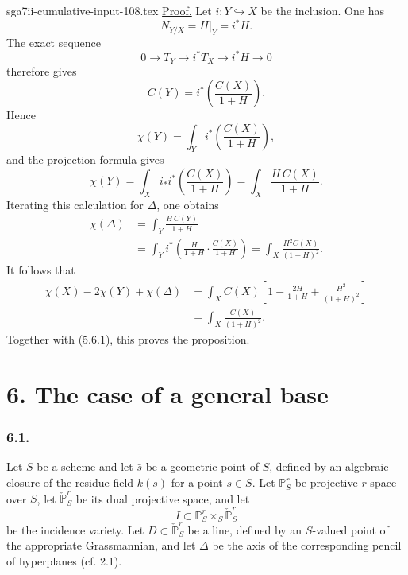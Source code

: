\begin{filecontents*}{sga7ii-cumulative-input-108.tex}
\noindent\underline{Proof.}
Let $i:Y\hookrightarrow X$ be the inclusion.  One has
\[
N_{Y/X}=H|_Y=i^*H.
\]
The exact sequence
\[
0\longrightarrow T_Y
\longrightarrow i^*T_X
\longrightarrow i^*H
\longrightarrow0
\]
therefore gives
\begin{equation}\tag{5.7.4}
C(Y)=i^*\!\left(\frac{C(X)}{1+H}\right).
\end{equation}
Hence
\[
\chi(Y)=\int_Yi^*\!\left(\frac{C(X)}{1+H}\right),
\]
and the projection formula gives
\begin{equation}\tag{5.7.5}
\chi(Y)
=\int_Xi_*i^*\!\left(\frac{C(X)}{1+H}\right)
=\int_X\frac{H\,C(X)}{1+H}.
\end{equation}
Iterating this calculation for $\Delta$, one obtains
\begin{equation}\tag{5.7.6}
\begin{aligned}
\chi(\Delta)
&=\int_Y\frac{H\,C(Y)}{1+H}\\
&=\int_Yi^*\!\left(
  \frac{H}{1+H}\cdot\frac{C(X)}{1+H}
  \right)
=\int_X\frac{H^2C(X)}{(1+H)^2}.
\end{aligned}
\end{equation}
It follows that
\[
\begin{aligned}
\chi(X)-2\chi(Y)+\chi(\Delta)
&=\int_XC(X)\left[
1-\frac{2H}{1+H}+\frac{H^2}{(1+H)^2}
\right]\\
&=\int_X\frac{C(X)}{(1+H)^2}.
\end{aligned}
\]
Together with (5.6.1), this proves the proposition.

\section*{6. The case of a general base}

\subsubsection*{6.1.}
Let $S$ be a scheme and let $\bar s$ be a geometric point of $S$,
defined by an algebraic closure of the residue field $k(s)$ for a
point $s\in S$.  Let $\mathbb P^r_S$ be projective $r$-space over
$S$, let $\check{\mathbb P}^{r}_S$ be its dual projective space, and
let
\[
I\subset\mathbb P^r_S\times_S\check{\mathbb P}^{r}_S
\]
be the incidence variety.  Let
$D\subset\check{\mathbb P}^{r}_S$ be a line, defined by an
$S$-valued point of the appropriate Grassmannian, and let $\Delta$ be
the axis of the corresponding pencil of hyperplanes (cf. 2.1).


\end{filecontents*}
